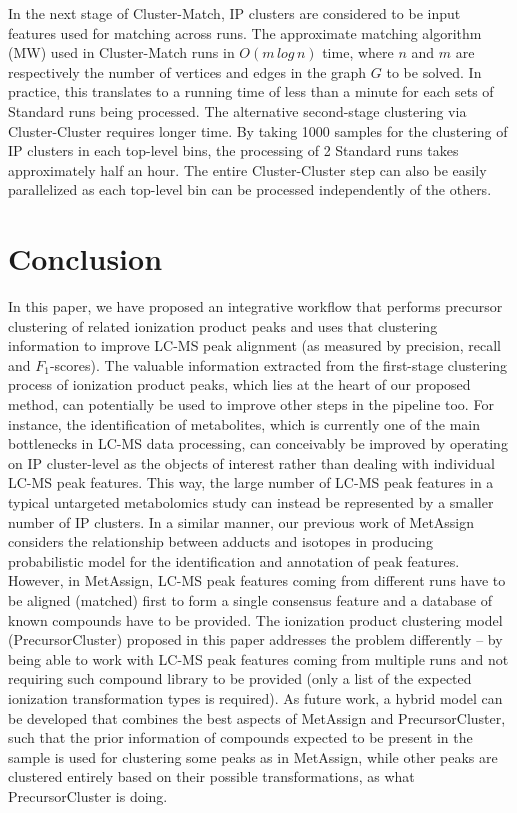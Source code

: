 In the next stage of Cluster-Match, IP clusters are considered to be input features used for matching across runs. The approximate matching algorithm (MW) used in Cluster-Match runs in $O(m\, log\, n)$ time, where $n$ and $m$ are respectively the number of vertices and edges in the graph $G$ to be solved. In practice, this translates to a running time of less than a minute for each sets of Standard runs being processed. The alternative second-stage clustering via Cluster-Cluster requires longer time. By taking 1000 samples for the clustering of IP clusters in each top-level bins, the processing of 2 Standard runs takes approximately half an hour. The entire Cluster-Cluster step can also be easily parallelized as each top-level bin can be processed independently of the others.

\section{Conclusion}

In this paper, we have proposed an integrative workflow that performs precursor clustering of related ionization product peaks and uses that clustering information to improve LC-MS peak alignment (as measured by precision, recall and $F_1$-scores). The valuable information extracted from the first-stage clustering process of ionization product peaks, which lies at the heart of our proposed method, can potentially be used to improve other steps in the pipeline too. For instance, the identification of metabolites, which is currently one of the main bottlenecks in LC-MS data processing, can conceivably be improved by operating on IP cluster-level as the objects of interest rather than dealing with individual LC-MS peak features. This way, the large number of LC-MS peak features in a typical untargeted metabolomics study can instead be represented by a smaller number of IP clusters. In a similar manner, our previous work of MetAssign \cite{Daly2014} considers the relationship between adducts and isotopes in producing probabilistic model for the identification and annotation of peak features. However, in MetAssign, LC-MS peak features coming from different runs have to be aligned (matched) first to form a single consensus feature and a database of known compounds have to be provided. The ionization product clustering model (PrecursorCluster) proposed in this paper addresses the problem differently -- by being able to work with LC-MS peak features coming from multiple runs and not requiring such compound library to be provided (only a list of the expected ionization transformation types is required). As future work, a hybrid model can be developed that combines the best aspects of MetAssign and PrecursorCluster, such that the prior information of compounds expected to be present in the sample is used for clustering some peaks as in MetAssign, while other peaks are clustered entirely based on their possible transformations, as what PrecursorCluster is doing. 

